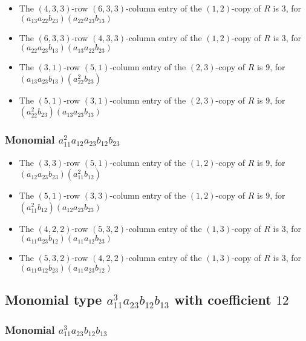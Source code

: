 \documentclass{article}
\begin{document}
\begin{itemize}
\item The $(4, 3, 3)$-row $(6, 3, 3)$-column entry of the $ \left(1, 2\right) $-copy of $R$ is $ 3 $, for $( a_{13} a_{22} b_{23} )( a_{22} a_{23} b_{13} )$ 
\item The $(6, 3, 3)$-row $(4, 3, 3)$-column entry of the $ \left(1, 2\right) $-copy of $R$ is $ 3 $, for $( a_{22} a_{23} b_{13} )( a_{13} a_{22} b_{23} )$ 
\item The $(3, 1)$-row $(5, 1)$-column entry of the $ \left(2, 3\right) $-copy of $R$ is $ 9 $, for $( a_{13} a_{23} b_{13} )( a_{22}^{2} b_{23} )$ 
\item The $(5, 1)$-row $(3, 1)$-column entry of the $ \left(2, 3\right) $-copy of $R$ is $ 9 $, for $( a_{22}^{2} b_{23} )( a_{13} a_{23} b_{13} )$ 
\end{itemize}
\subsubsection{Monomial $ a_{11}^{2} a_{12} a_{23} b_{12} b_{23} $}

\begin{itemize}
\item The $(3, 3)$-row $(5, 1)$-column entry of the $ \left(1, 2\right) $-copy of $R$ is $ 9 $, for $( a_{12} a_{23} b_{23} )( a_{11}^{2} b_{12} )$ 
\item The $(5, 1)$-row $(3, 3)$-column entry of the $ \left(1, 2\right) $-copy of $R$ is $ 9 $, for $( a_{11}^{2} b_{12} )( a_{12} a_{23} b_{23} )$ 
\item The $(4, 2, 2)$-row $(5, 3, 2)$-column entry of the $ \left(1, 3\right) $-copy of $R$ is $ 3 $, for $( a_{11} a_{23} b_{12} )( a_{11} a_{12} b_{23} )$ 
\item The $(5, 3, 2)$-row $(4, 2, 2)$-column entry of the $ \left(1, 3\right) $-copy of $R$ is $ 3 $, for $( a_{11} a_{12} b_{23} )( a_{11} a_{23} b_{12} )$ 
\end{itemize}
\subsection{Monomial type $ a_{11}^{3} a_{23} b_{12} b_{13} $ with coefficient $ 12 $}

\subsubsection{Monomial $ a_{11}^{3} a_{23} b_{12} b_{13} $}
\end{document}
